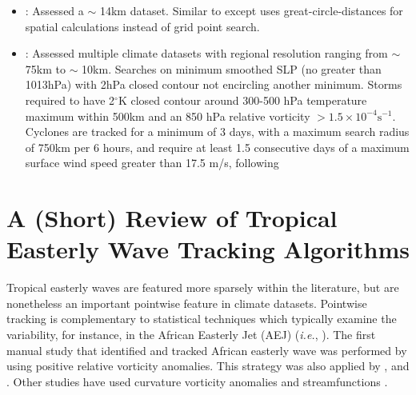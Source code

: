 \documentclass[gmdd, hvmath]{copernicus}
\begin{document}
\begin{itemize}
\item \cite{bosler2016stride}:  Assessed a $\sim$ 14km dataset. Similar to \cite{knutson2007simulation, zhao2009simulations} except uses great-circle-distances for spatial calculations instead of grid point search.

\item \cite{harris2016hiram}:  Assessed multiple climate datasets with regional resolution ranging from $\sim$ 75km to $\sim$ 10km. Searches on minimum smoothed SLP (no greater than 1013hPa) with 2hPa closed contour not encircling another minimum. Storms required to have 2$^\circ$K closed contour around 300-500 hPa temperature maximum within 500km and an 850 hPa relative vorticity $> 1.5 \times 10^{-4} \mbox{s}^{-1}$. Cyclones are tracked for a minimum of 3 days, with a maximum search radius of 750km per 6 hours, and require at least 1.5 consecutive days of a maximum surface wind speed greater than 17.5 m/s, following \citet{chen2011predictability}

\end{itemize}

\section{A (Short) Review of Tropical Easterly Wave Tracking Algorithms} \label{sec:TropicalEasterlyWaveAlgorithms}


Tropical easterly waves are featured more sparsely within the literature, but are nonetheless an important pointwise feature in climate datasets.  Pointwise tracking is complementary to statistical techniques which typically examine the variability, for instance, in the African Easterly Jet (AEJ) (\textit{i.e.}, \cite{ceron1999validation}).  The first manual study that identified and tracked African easterly wave was performed by \cite{reed1988evaluation} using positive relative vorticity anomalies.  This strategy was also applied by \cite{thorncroft2001african}, \cite{hodges2003comparison} and \cite{serra2010tracking}.  Other studies have used curvature vorticity anomalies \cite{agudelo2011aews,belanger2014african, bain2014objective,brammer2015aew} and streamfunctions \citep{berry2007african}.%

\end{document}
